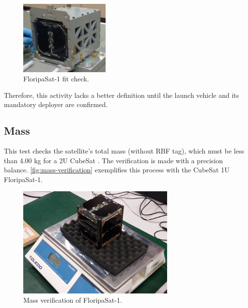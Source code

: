 \begin{figure}[!htb]
    \begin{center}
        \includegraphics[width=0.4\textwidth]{figures/fit-test.png}
        \caption{FloripaSat-1 fit check.}
        \label{fig:PODfitcheck}
    \end{center}
\end{figure}


Therefore, this activity lacks a better definition until the launch vehicle and its mandatory deployer are confirmed.

\subsection{Mass}

This test checks the satellite's total mass (without RBF tag), which must be less than 4.00 kg for a 2U CubeSat \cite{cds}. The verification is made with a precision balance. \autoref{fig:mass-verification} exemplifies this process with the CubeSat 1U FloripaSat-1.

\begin{figure}[H]
    \begin{center}
        \includegraphics[width=0.7\textwidth]{figures/mass-test.png}
        \caption{Mass verification of FloripaSat-1.}
        \label{fig:mass-verification}
    \end{center}
\end{figure}

